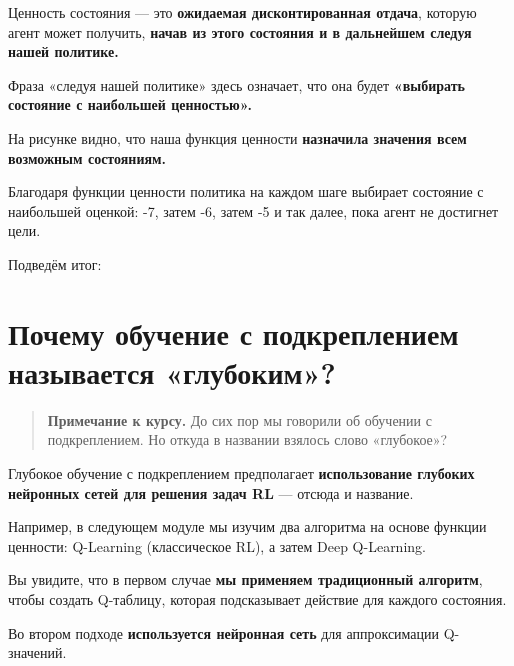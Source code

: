 \documentclass[11pt,a4paper]{article}
\begin{document}
Ценность состояния --- это \textbf{ожидаемая дисконтированная отдача}, которую агент может получить, \textbf{начав из этого состояния и в дальнейшем следуя нашей политике.}

Фраза «следуя нашей политике» здесь означает, что она будет \textbf{«выбирать состояние с наибольшей ценностью».}


На рисунке видно, что наша функция ценности \textbf{назначила значения всем возможным состояниям.}


Благодаря функции ценности политика на каждом шаге выбирает состояние с наибольшей оценкой: -7, затем -6, затем -5 и так далее, пока агент не достигнет цели.

Подведём итог:



\section{Почему обучение с подкреплением называется «глубоким»?}\label{the-deep-in-reinforcement-learning}

\begin{quote}
\textbf{Примечание к курсу.} До сих пор мы говорили об обучении с подкреплением. Но откуда в названии взялось слово «глубокое»?
\end{quote}

Глубокое обучение с подкреплением предполагает \textbf{использование глубоких нейронных сетей для решения задач RL} --- отсюда и название.

Например, в следующем модуле мы изучим два алгоритма на основе функции ценности: Q-Learning (классическое RL), а затем Deep Q-Learning.

Вы увидите, что в первом случае \textbf{мы применяем традиционный алгоритм}, чтобы создать Q-таблицу, которая подсказывает действие для каждого состояния.

Во втором подходе \textbf{используется нейронная сеть} для аппроксимации Q-значений.
\end{document}
